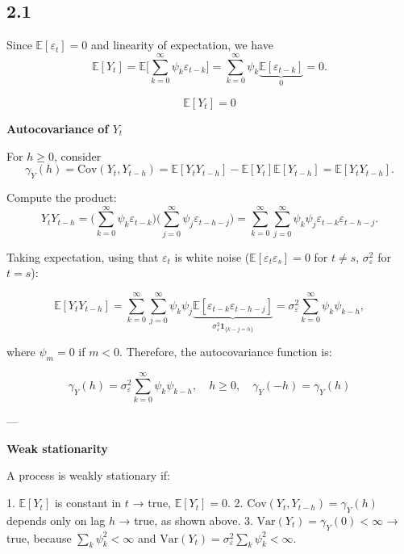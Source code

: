 \documentclass[11pt]{article}
\begin{document}
\begin{solution}  %
\subsection*{2.1}

Since \(\mathbb{E}[\varepsilon_t] = 0\) and linearity of expectation, we have
\[
\mathbb{E}[Y_t] = \mathbb{E}\Big[\sum_{k=0}^{\infty} \psi_k \varepsilon_{t-k}\Big] 
= \sum_{k=0}^{\infty} \psi_k \underbrace{\mathbb{E}[\varepsilon_{t-k}]}_{0} = 0.
\]

\[
\boxed{\mathbb{E}[Y_t] = 0}
\]


\textbf{Autocovariance of \(Y_t\)}

For \(h \ge 0\), consider
\[
\gamma_Y(h) = \text{Cov}(Y_t, Y_{t-h}) = \mathbb{E}[Y_t Y_{t-h}] - \mathbb{E}[Y_t]\mathbb{E}[Y_{t-h}] = \mathbb{E}[Y_t Y_{t-h}].
\]

Compute the product:
\[
Y_t Y_{t-h} = \Big( \sum_{k=0}^{\infty} \psi_k \varepsilon_{t-k} \Big)
\Big( \sum_{j=0}^{\infty} \psi_j \varepsilon_{t-h-j} \Big)
= \sum_{k=0}^{\infty} \sum_{j=0}^{\infty} \psi_k \psi_j \varepsilon_{t-k} \varepsilon_{t-h-j}.
\]

Taking expectation, using that \(\varepsilon_t\) is white noise (\(\mathbb{E}[\varepsilon_t \varepsilon_s] = 0\) for \(t \neq s\), \(\sigma_\varepsilon^2\) for \(t=s\)):

\[
\mathbb{E}[Y_t Y_{t-h}] = \sum_{k=0}^{\infty} \sum_{j=0}^{\infty} \psi_k \psi_j \underbrace{\mathbb{E}[\varepsilon_{t-k} \varepsilon_{t-h-j}]}_{\sigma_\varepsilon^2 \mathbf{1}_{\{k - j = h\}}}
= \sigma_\varepsilon^2 \sum_{k=0}^{\infty} \psi_k \psi_{k-h},
\]

where \(\psi_{m} = 0\) if \(m < 0\). Therefore, the autocovariance function is:

\[
\boxed{\gamma_Y(h) = \sigma_\varepsilon^2 \sum_{k=0}^{\infty} \psi_k \psi_{k-h}, \quad h \ge 0, \quad \gamma_Y(-h) = \gamma_Y(h)}
\]

---

\textbf{Weak stationarity}

A process is weakly stationary if:

1. \(\mathbb{E}[Y_t]\) is constant in \(t\) → true, \(\mathbb{E}[Y_t] = 0\).  
2. \(\text{Cov}(Y_t, Y_{t-h}) = \gamma_Y(h)\) depends only on lag \(h\) → true, as shown above.  
3. \(\text{Var}(Y_t) = \gamma_Y(0) < \infty\) → true, because \(\sum_k \psi_k^2 < \infty\) and \(\text{Var}(Y_t) = \sigma_\varepsilon^2 \sum_k \psi_k^2 < \infty\).


\end{solution}
\end{document}
